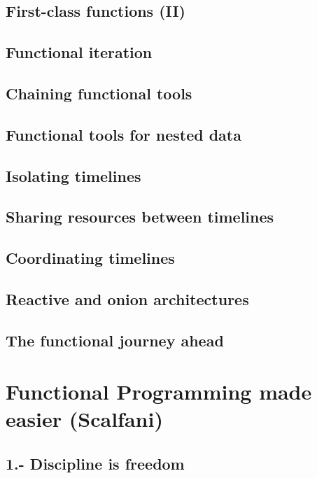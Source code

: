 \section{First-class functions (II)}
\section{Functional iteration}
\section{Chaining functional tools}
\section{Functional tools for nested data}
\section{Isolating timelines}
\section{Sharing resources between timelines}
\section{Coordinating timelines}
\section{Reactive and onion architectures}
\section{The functional journey ahead}



%
%
%	

\chapter{Functional Programming made easier (Scalfani)}

\section{1.- Discipline is freedom}
